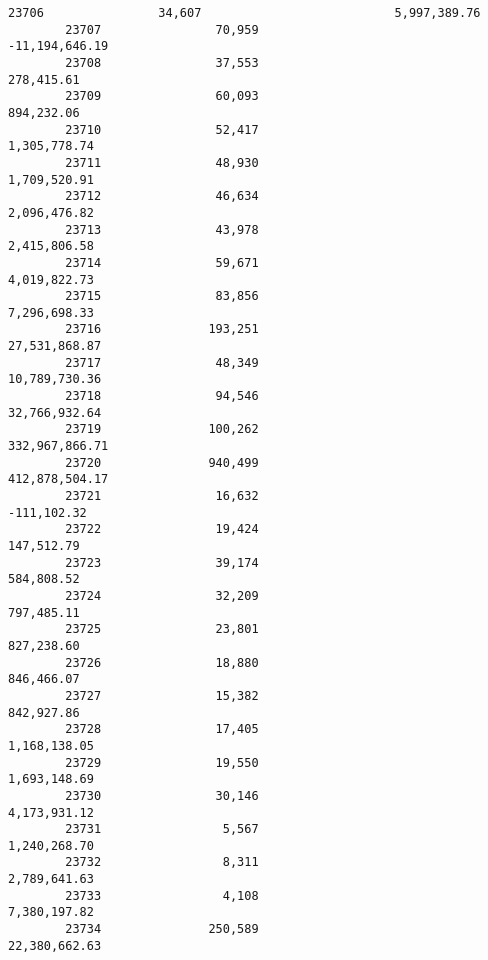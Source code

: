 \documentclass[11pt]{article}
\begin{document}
\begin{Verbatim}[commandchars=\\\{\}]
        23706                34,607                           5,997,389.76   
        23707                70,959                         -11,194,646.19   
        23708                37,553                             278,415.61   
        23709                60,093                             894,232.06   
        23710                52,417                           1,305,778.74   
        23711                48,930                           1,709,520.91   
        23712                46,634                           2,096,476.82   
        23713                43,978                           2,415,806.58   
        23714                59,671                           4,019,822.73   
        23715                83,856                           7,296,698.33   
        23716               193,251                          27,531,868.87   
        23717                48,349                          10,789,730.36   
        23718                94,546                          32,766,932.64   
        23719               100,262                         332,967,866.71   
        23720               940,499                         412,878,504.17   
        23721                16,632                            -111,102.32   
        23722                19,424                             147,512.79   
        23723                39,174                             584,808.52   
        23724                32,209                             797,485.11   
        23725                23,801                             827,238.60   
        23726                18,880                             846,466.07   
        23727                15,382                             842,927.86   
        23728                17,405                           1,168,138.05   
        23729                19,550                           1,693,148.69   
        23730                30,146                           4,173,931.12   
        23731                 5,567                           1,240,268.70   
        23732                 8,311                           2,789,641.63   
        23733                 4,108                           7,380,197.82   
        23734               250,589                          22,380,662.63   
        

\end{Verbatim}
\end{document}
